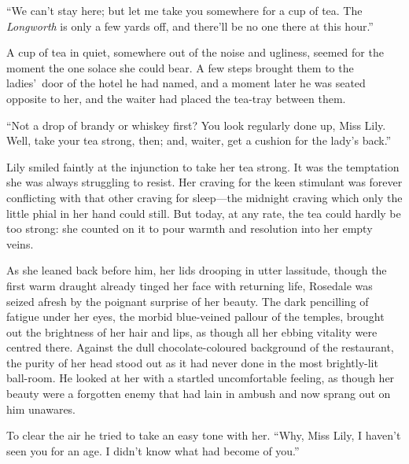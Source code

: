 \documentclass[12pt,a4paper]{book}
\begin{document}
``We can't stay here; but let me take you somewhere for a cup of
tea. The \textit{Longworth} is only a few yards off, and there'll be no
one there at this hour.''





A cup of tea in quiet, somewhere out of the noise and ugliness,
seemed for the moment the one solace she could bear. A few steps
brought them to the ladies'\ door of the hotel he had named, and a
moment later he was seated opposite to her, and the waiter had
placed the tea-tray between them.





``Not a drop of brandy or whiskey first? You look regularly done
up, Miss Lily. Well, take your tea strong, then; and, waiter, get
a cushion for the lady's back.''





Lily smiled faintly at the injunction to take her tea strong. It
was the temptation she was always struggling to resist. Her
craving for the keen stimulant was forever conflicting with that
other craving for sleep---the midnight craving which only the
little phial in her hand could still. But today, at any rate, the
tea could hardly be too strong: she counted on it to pour warmth
and resolution into her empty veins.





As she leaned back before him, her lids drooping in utter
lassitude, though the first warm draught already tinged her face
with returning life, Rosedale was seized afresh by the poignant
surprise of her beauty. The dark pencilling of fatigue under her
eyes, the morbid blue-veined pallour of the temples,
brought out the brightness of her hair and lips, as though all
her ebbing vitality were centred there. Against the dull
chocolate-coloured background of the restaurant, the purity of
her head stood out as it had never done in the most brightly-lit
ball-room. He looked at her with a startled uncomfortable
feeling, as though her beauty were a forgotten enemy that had
lain in ambush and now sprang out on him unawares.





To clear the air he tried to take an easy tone with her. ``Why,
Miss Lily, I haven't seen you for an age. I didn't know what had
become of you.''
\end{document}
